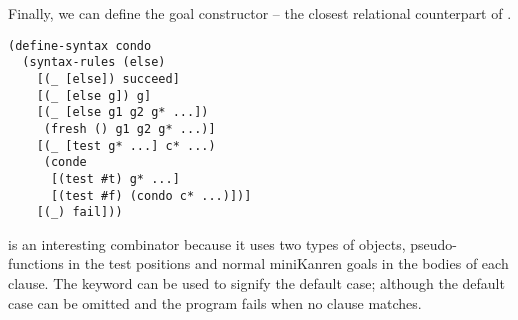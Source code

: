 Finally, we can define the goal constructor  -- the closest relational counterpart of .
\begin{lstlisting}
(define-syntax condo
  (syntax-rules (else)
    [(_ [else]) succeed]
    [(_ [else g]) g]
    [(_ [else g1 g2 g* ...])
     (fresh () g1 g2 g* ...)]
    [(_ [test g* ...] c* ...)
     (conde
      [(test #t) g* ...]
      [(test #f) (condo c* ...)])]
    [(_) fail]))
\end{lstlisting}
 is an interesting combinator because it uses two types of objects, pseudo-functions in the test positions and normal miniKanren goals in the bodies of each clause. The  keyword can be used to signify the default case; although the default case can be omitted and the program fails when no clause matches.